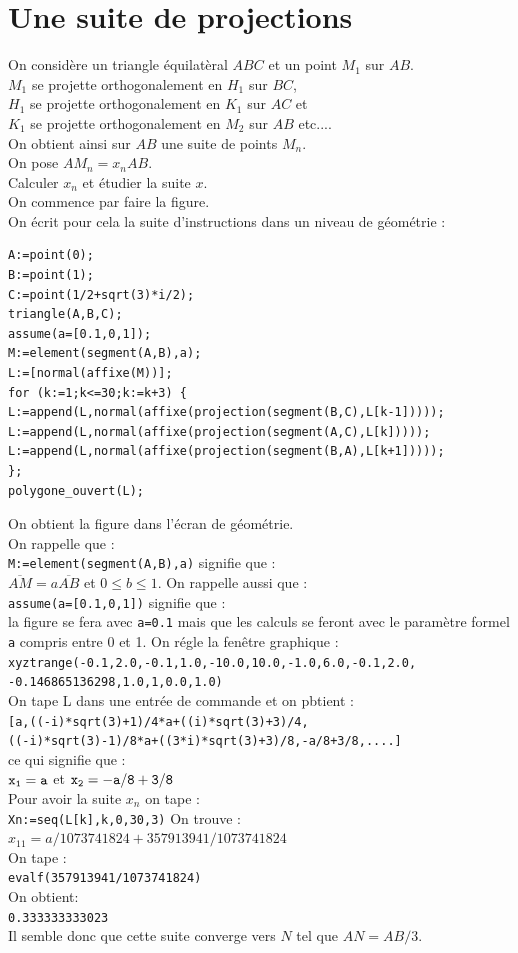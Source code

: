 \documentclass[a4paper,11pt]{book}
\begin{document}
\section{Une suite de projections}
On consid\`ere un triangle \'equilat\`eral $ABC$ et un point $M_1$ sur $AB$.\\
$M_1$ se projette orthogonalement en $H_1$ sur $BC$,\\
$H_1$ se projette orthogonalement en $K_1$ sur $AC$ et\\
$K_1$ se projette orthogonalement en $M_2$ sur $AB$ etc....\\
On obtient ainsi sur $AB$ une suite de points $M_n$.\\
On pose $AM_n=x_nAB$.\\
Calculer $x_n$ et \'etudier la suite $x$.\\
On commence par faire la figure.\\
 On \'ecrit pour cela la suite d'instructions dans un niveau de g\'eom\'etrie :
\begin{verbatim}
A:=point(0);
B:=point(1);
C:=point(1/2+sqrt(3)*i/2);
triangle(A,B,C);
assume(a=[0.1,0,1]);
M:=element(segment(A,B),a);
L:=[normal(affixe(M))];
for (k:=1;k<=30;k:=k+3) {
L:=append(L,normal(affixe(projection(segment(B,C),L[k-1]))));
L:=append(L,normal(affixe(projection(segment(A,C),L[k]))));
L:=append(L,normal(affixe(projection(segment(B,A),L[k+1]))));
};
polygone_ouvert(L);
\end{verbatim} 
On obtient la figure dans l'\'ecran de g\'eom\'etrie.\\
 On rappelle que :\\
{\tt M:=element(segment(A,B),a)} signifie que :\\
$\overline{AM}=a\overline{AB}$ et $0 \leq b \leq 1$.
On rappelle aussi que :\\
{\tt assume(a=[0.1,0,1])} signifie que :\\
la figure se fera avec {\tt a=0.1} mais que les calculs se feront avec le 
param\`etre formel {\tt a} compris entre 0 et 1.
On r\'egle la fen\^etre graphique :\\
{\tt xyztrange(-0.1,2.0,-0.1,1.0,-10.0,10.0,-1.0,6.0,-0.1,2.0,\\
-0.146865136298,1.0,1,0.0,1.0) }\\
On tape L dans une entr\'ee de commande et on pbtient :\\
{\tt [a,((-i)*sqrt(3)+1)/4*a+((i)*sqrt(3)+3)/4,\\
((-i)*sqrt(3)-1)/8*a+((3*i)*sqrt(3)+3)/8,-a/8+3/8,....]}\\
ce qui signifie que :\\
${\tt x_1=a}$ et ${\tt x_2=-a/8+3/8}$\\
Pour avoir la suite $x_n$ on tape :\\
{\tt Xn:=seq(L[k],k,0,30,3)}
On trouve : $x_{11}=a/1073741824+357913941/1073741824$\\
On tape :\\
{\tt evalf(357913941/1073741824)}\\
On obtient:\\
{\tt 0.333333333023}\\
Il semble donc que cette suite converge vers $N$ tel que $AN=AB/3$.
\end{document}
